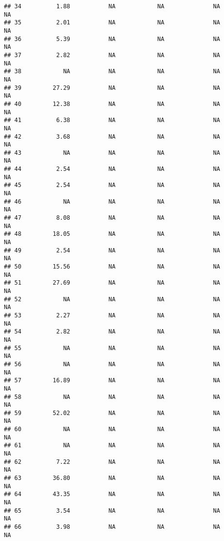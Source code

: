 \documentclass[]{article}
\begin{document}
\begin{verbatim}
## 34          1.88           NA            NA              NA               NA
## 35          2.01           NA            NA              NA               NA
## 36          5.39           NA            NA              NA               NA
## 37          2.82           NA            NA              NA               NA
## 38            NA           NA            NA              NA               NA
## 39         27.29           NA            NA              NA               NA
## 40         12.38           NA            NA              NA               NA
## 41          6.38           NA            NA              NA               NA
## 42          3.68           NA            NA              NA               NA
## 43            NA           NA            NA              NA               NA
## 44          2.54           NA            NA              NA               NA
## 45          2.54           NA            NA              NA               NA
## 46            NA           NA            NA              NA               NA
## 47          8.08           NA            NA              NA               NA
## 48         18.05           NA            NA              NA               NA
## 49          2.54           NA            NA              NA               NA
## 50         15.56           NA            NA              NA               NA
## 51         27.69           NA            NA              NA               NA
## 52            NA           NA            NA              NA               NA
## 53          2.27           NA            NA              NA               NA
## 54          2.82           NA            NA              NA               NA
## 55            NA           NA            NA              NA               NA
## 56            NA           NA            NA              NA               NA
## 57         16.89           NA            NA              NA               NA
## 58            NA           NA            NA              NA               NA
## 59         52.02           NA            NA              NA               NA
## 60            NA           NA            NA              NA               NA
## 61            NA           NA            NA              NA               NA
## 62          7.22           NA            NA              NA               NA
## 63         36.80           NA            NA              NA               NA
## 64         43.35           NA            NA              NA               NA
## 65          3.54           NA            NA              NA               NA
## 66          3.98           NA            NA              NA               NA

\end{verbatim}
\end{document}
